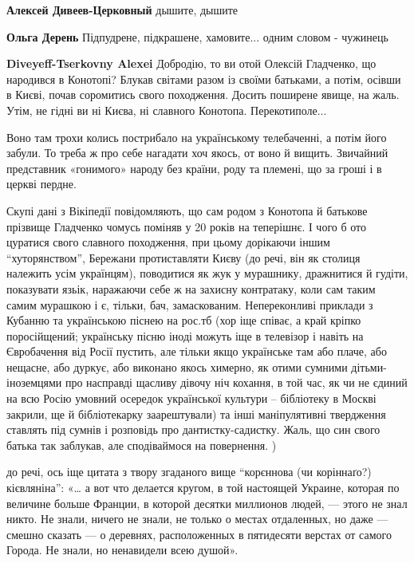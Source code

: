 \begin{itemize}
\textbf{Алексей Дивеев-Церковный} дышите, дышите


\textbf{Ольга Дерень} Підпудрене, підкрашене, хамовите... одним словом - чужинець


\textbf{Diveyeff-Tserkovny Alexei} Добродію, то ви отой Олексій Гладченко, що
народився в Конотопі? Блукав світами разом із своїми батьками, а потім, осівши
в Києві, почав соромитись свого походження. Досить поширене явище, на жаль.
Утім, не гідні ви ні Києва, ні славного Конотопа. Перекотиполе...


Воно там трохи колись пострибало на українському телебаченні, а потім його
забули.  То треба ж про себе нагадати хоч якось, от воно й вищить.  Звичайний
представник «гонимого» народу без країни, роду та племені, що за гроші і в
церкві пердне.


Скупі дані з Вікіпедії повідомляють, що сам родом з Конотопа й батькове
прізвище Гладченко чомусь поміняв у 20 років на теперішнє. І чого б ото
цуратися свого славного походження, при цьому дорікаючи іншим \enquote{хуторянством},
Бережани протиставляти Києву (до речі, він як столиця належить усім українцям),
поводитися як жук у мурашнику, дражнитися й гудіти, показувати язьік, наражаючи
себе ж на захисну контратаку, коли сам таким самим мурашкою і є, тільки, бач,
замаскованим. Непереконливі приклади з Кубанню та українською піснею на рос.тб
(хор іще співає, а край кріпко поросійщений; українську пісню іноді можуть іще
в телевізор і навіть на Євробачення від Росії пустить, але тільки якщо
українське там або плаче, або нещасне, або дуркує, або виконано якось химерно,
як отими сумними дітьми-іноземцями про насправді щасливу дівочу ніч кохання, в
той час, як чи не єдиний на всю Росію умовний осередок української культури --
бібліотеку в Москві закрили, ще й бібліотекарку заарештували) та інші
маніпулятивні твердження ставлять під сумнів і розповідь про
дантистку-садистку. Жаль, що син свого батька так заблукав, але сподіваймося на
повернення. )


до речі, ось іще цитата з твору згаданого вище \enquote{корєннова (чи
коріннаґо?) кієвляніна}: «… а вот что делается кругом, в той настоящей Украине,
которая по величине больше Франции, в которой десятки миллионов людей, — этого
не знал никто. Не знали, ничего не знали, не только о местах отдаленных, но
даже — смешно сказать — о деревнях, расположенных в пятидесяти верстах от
самого Города. Не знали, но ненавидели всею душой».


\end{itemize}
